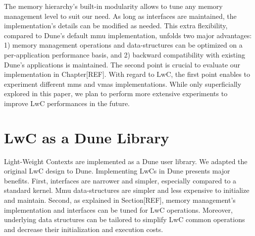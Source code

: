 The memory hierarchy's built-in modularity allows to tune any memory management level to suit our need.
As long as interfaces are maintained, the implementation's details can be modified as needed.
This extra flexibility, compared to Dune's default mmu implementation, unfolds two major advantages: 1) memory management operations and data-structures can be optimized on a per-application performance basis, and 2) backward compatibility with existing Dune's applications is maintained.
The second point is crucial to evaluate our implementation in Chapter[REF].
With regard to LwC, the first point enables to experiment different mms and vmas implementations.
While only superficially explored in this paper, we plan to perform more extensive experiments to improve LwC performances in the future.

\section{LwC as a Dune Library}
Light-Weight Contexts are implemented as a Dune user library.
We adapted the original LwC design to Dune.
Implementing LwCs in Dune presents major benefits.
First, interfaces are narrower and simpler, especially compared to a standard kernel.
Mmu data-structures are simpler and less expensive to initialize and maintain. 
Second, as explained in Section[REF], memory management's implementation and interfaces can be tuned for LwC operations.
Moreover, underlying data structures can be tailored to simplify LwC common operations and decrease their initialization and execution costs.




